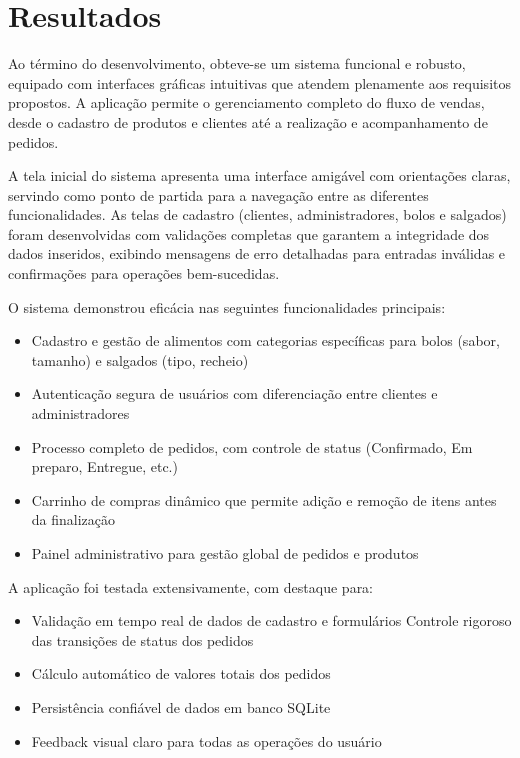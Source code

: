 \documentclass[conference]{IEEEtran}
\begin{document}
\section{Resultados}
Ao término do desenvolvimento, obteve-se um sistema funcional e robusto, equipado com interfaces gráficas intuitivas que atendem plenamente aos requisitos propostos. A aplicação permite o gerenciamento completo do fluxo de vendas, desde o cadastro de produtos e clientes até a realização e acompanhamento de pedidos.

A tela inicial do sistema apresenta uma interface amigável com orientações claras, servindo como ponto de partida para a navegação entre as diferentes funcionalidades. As telas de cadastro (clientes, administradores, bolos e salgados) foram desenvolvidas com validações completas que garantem a integridade dos dados inseridos, exibindo mensagens de erro detalhadas para entradas inválidas e confirmações para operações bem-sucedidas.

O sistema demonstrou eficácia nas seguintes funcionalidades principais:

\begin{itemize}
    \item Cadastro e gestão de alimentos com categorias específicas para bolos (sabor, tamanho) e salgados (tipo, recheio)
    \item Autenticação segura de usuários com diferenciação entre clientes e administradores
    \item Processo completo de pedidos, com controle de status (Confirmado, Em preparo, Entregue, etc.)
    \item Carrinho de compras dinâmico que permite adição e remoção de itens antes da finalização
    \item Painel administrativo para gestão global de pedidos e produtos
\end{itemize}

A aplicação foi testada extensivamente, com destaque para:

\begin{itemize}
    \item Validação em tempo real de dados de cadastro e formulários
    \interface{} Controle rigoroso das transições de status dos pedidos
    \item Cálculo automático de valores totais dos pedidos
    \item Persistência confiável de dados em banco SQLite
    \item Feedback visual claro para todas as operações do usuário
\end{itemize}
\end{document}
